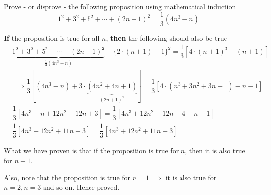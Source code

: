 
\question Prove - or disprove - the following proposition using mathematical induction
\[ 1^2 + 3^2 + 5^2 + \cdots + (2n-1)^2 = \dfrac{1}{3}(4n^3-n) \]

\insertQR{}

\begin{solution}
  \textbf{If} the proposition is true for all $n$, \textbf{then} the following should also 
  be true
  \begin{align}
    &\underbrace{1^2+3^2+5^2+\cdots+(2n-1)^2}_{\frac{1}{3}(4n^3-n)} +
    \lbrace 2\cdot(n+1)-1\rbrace^2 = \dfrac{1}{3}\left[4\cdot(n+1)^3-(n+1) \right] \\
    &\implies \dfrac{1}{3}\left[ (4n^3-n) + 3\cdot\underbrace{(4n^2+4n+1)}_{(2n+1)^2} \right] = 
    \dfrac{1}{3}\left[ 4\cdot (n^3+3n^2+3n+1) - n - 1\right] \\
    &\dfrac{1}{3}\left[ 4n^3-n +12n^2+12n+3\right] =
    \dfrac{1}{3}\left[ 4n^3 + 12n^2 + 12n + 4 -n - 1\right] \\
    &\dfrac{1}{3}\left[ 4n^3+12n^2+11n + 3\right] = \dfrac{1}{3}\left[ 4n^3 + 12n^2 +11n + 3\right]
  \end{align}

  What we have proven is that if the proposition is true for $n$, then it is also 
  true for $n+1$. 

  Also, note that the proposition is true for $n=1\implies$ it is also true for $n=2, n=3$ 
  and so on. Hence proved.
\end{solution}

